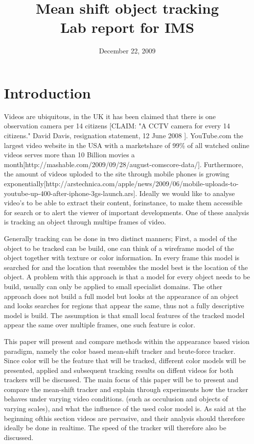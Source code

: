 \documentclass[a4paper,11pt]{article}
\title{Mean shift object tracking\\ Lab report for IMS}
\date{December 22, 2009}
\begin{document}
\maketitle
\section{Introduction}
	Videos are ubiquitous, in the UK it has been claimed that there is one observation camera per 14 citizens [CLAIM: "A CCTV camera for every 14 citizens."
	David Davis, resignation statement, 12 June 2008 ]. YouTube.com the largest video website in the USA with a marketshare of 99\% of all watched online videos serves more than 10 Billion movies a month[http://mashable.com/2009/09/28/august-comscore-data/]. 
	Furthermore, the amount of videos uploded to the site through mobile phones is growing exponentially[http://arstechnica.com/apple/news/2009/06/mobile-uploads-to-youtube-up-400-after-iphone-3gs-launch.ars].
	Ideally we would like to analyse video's to be able to extract their content, forinstance, to make them accessible for search or to alert the viewer of important developments. One of these analysis is tracking an object through multipe frames of video.

	Generally tracking can be done in two distinct manners; First, a model of the object to be tracked can be build, one can think of a wireframe model of the object together with texture or color information. 
	In every frame this model is searched for and the location that resembles the model best is the location of the object. A problem with this approach is that a model for every object needs to be build, usually can only be applied to small specialist domains. 
	The other approach does not build a full model but looks at the appearance of an object and looks searches for regions that appear the same, thus not a fully descriptive model is build. 
	The assumption is that small local features of the tracked model appear the same over multiple frames, one such feature is color.

	This paper will present and compare methods within the appearance based vision paradigm, namely the color based mean-shift tracker and brute-force tracker. 
	Since color will be the feature that will be tracked, different color models will be presented, applied and subsequent tracking results on diffent videos for both trackers will be discussed.
	The main focus of this paper will be to present and compare the mean-shift tracker and explain through experiments how the tracker behaves under varying video conditions. (such as occulusion and objects of varying scales), and what the influence of the used color model is.
	As said at the beginning ofthis section videos are pervasive, and their analysis should therefore ideally be done in realtime. The speed of the tracker will therefore also be discussed.
\end{document}
